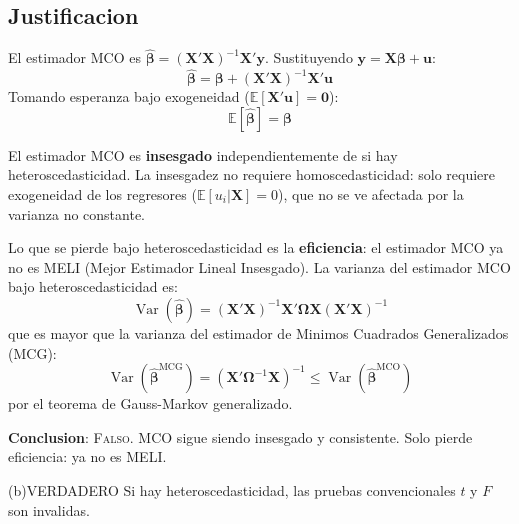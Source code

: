 \documentclass[12pt, letterpaper]{article}
\theoremstyle{remark}
\newcommand{\E}{\mathbb{E}}
\newcommand{\Var}{\operatorname{Var}}
\begin{document}
\subsection*{Justificacion}

El estimador MCO es $\hat{\boldsymbol\beta} = (\mathbf{X'X})^{-1}\mathbf{X'y}$.
Sustituyendo $\mathbf{y} = \mathbf{X}\boldsymbol\beta + \mathbf{u}$:
\begin{equation}
  \hat{\boldsymbol\beta}
    = \boldsymbol\beta + (\mathbf{X'X})^{-1}\mathbf{X'u}
  \label{eq:beta_descomp}
\end{equation}
Tomando esperanza bajo exogeneidad ($\E[\mathbf{X'u}] = \mathbf{0}$):
\begin{equation}
  \E[\hat{\boldsymbol\beta}] = \boldsymbol\beta
  \label{eq:insesgado}
\end{equation}

El estimador MCO es \textbf{insesgado} independientemente de si hay
heteroscedasticidad. La insesgadez no requiere homoscedasticidad: solo
requiere exogeneidad de los regresores ($\E[u_i | \mathbf{X}] = 0$),
que no se ve afectada por la varianza no constante.

Lo que se pierde bajo heteroscedasticidad es la \textbf{eficiencia}: el
estimador MCO ya no es MELI (Mejor Estimador Lineal Insesgado). La varianza
del estimador MCO bajo heteroscedasticidad es:
\begin{equation}
  \Var(\hat{\boldsymbol\beta}) = (\mathbf{X'X})^{-1}\mathbf{X'}\boldsymbol\Omega\mathbf{X}(\mathbf{X'X})^{-1}
  \label{eq:var_heterosc}
\end{equation}
que es mayor que la varianza del estimador de Minimos Cuadrados Generalizados
(MCG):
\begin{equation}
  \Var(\hat{\boldsymbol\beta}^{\text{MCG}}) = (\mathbf{X'}\boldsymbol\Omega^{-1}\mathbf{X})^{-1}
  \leq \Var(\hat{\boldsymbol\beta}^{\text{MCO}})
  \label{eq:MCG_eficiente}
\end{equation}
por el teorema de Gauss-Markov generalizado.

\textbf{Conclusion}: \textsc{Falso}. MCO sigue siendo insesgado y consistente.
Solo pierde eficiencia: ya no es MELI.

\bigskip

\begin{verdict}{(b)}{VERDADERO}
  Si hay heteroscedasticidad, las pruebas convencionales $t$ y $F$ son invalidas.
\end{verdict}
\end{document}
